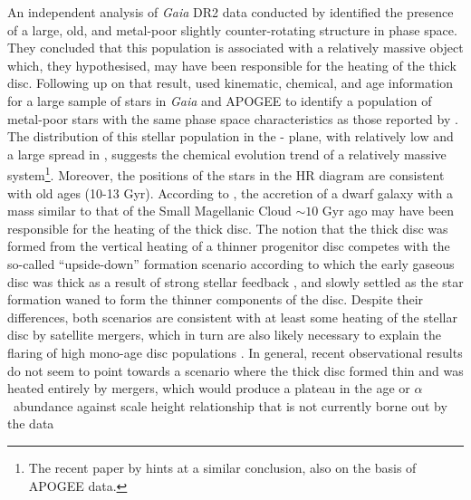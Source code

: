 An independent analysis of \emph{Gaia} DR2 data conducted by
\citet{2018ApJ...860L..11K} identified the presence of a large,
old, and metal-poor slightly counter-rotating structure in phase space.
They concluded that this population is associated with a relatively
massive object which, they hypothesised, may have been responsible
for the heating of the thick disc.  Following up on that result,
\citet{2018arXiv180606038H} used kinematic, chemical, and age
information for a large sample of stars in \emph{Gaia} and APOGEE
to identify a population of metal-poor stars with the same phase
space characteristics as those reported by
\citet{2018ApJ...860L..11K}.  The distribution of this stellar
population in the \afe{}-\feh{} plane, with relatively low \afe{}
and a large spread in \feh{}, suggests the chemical evolution trend
of a relatively massive system\footnote{The recent paper by
\citet{2018arXiv180707269F} hints at a similar conclusion, also on
the basis of APOGEE data.}.  Moreover, the positions of the stars
in the HR diagram are consistent with old ages (10-13 Gyr).  According
to  \citet{2018arXiv180606038H}, the accretion of a dwarf galaxy
with a mass similar to that of the Small Magellanic Cloud
\citep[see also][]{2018ApJ...852...49H} $\sim 10$ Gyr ago may have
been responsible for the heating of the thick disc. {\red The notion that
the thick disc was formed from the vertical heating of a thinner
progenitor disc competes
with the so-called ``upside-down'' formation scenario \citep[see,
e.g,][]{2013ApJ...773...43B,2017arXiv170901040N} according to which
the early gaseous disc was thick as a result of strong stellar
feedback \citep[and/or clumpy gas accretion, e.g.,][]{2004ApJ...612..894B},
and slowly settled as the star formation waned to form the thinner
components of the disc.  Despite their differences, both scenarios
are consistent with at least some heating of the stellar disc by
satellite mergers, which in turn are also likely necessary to explain
the flaring of high \afe{} mono-age disc populations
\citep[e.g.][]{2015ApJ...804L...9M,2017arXiv170600018M}.  In general,
recent observational results do not seem to point towards a scenario
where the thick disc formed thin and was heated entirely by mergers,
which would produce a plateau in the age or $\alpha$~abundance
against scale height relationship that is not currently borne out
by the data
\citep[e.g.][]{2012ApJ...751..131B,2012ApJ...753..148B,2012ApJ...755..115B,2016ApJ...823...30B,2016MNRAS.455..987C,2017arXiv170600018M}
}

